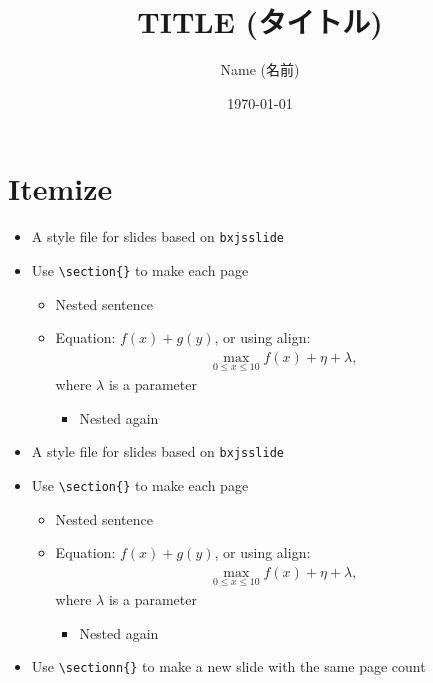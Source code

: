 \documentclass[xelatex,ja=standard,jafont=hiragino-pron,fleqn,no-math,25pt,paper={190.5truemm}{254truemm},english]{bxjsslidemd}
\title{TITLE (タイトル)}
\author{Name (名前)}
\date{\today}
\begin{document}
\maketitle

\section{Itemize}
\begin{itemize}
 \item A style file for slides based on \texttt{bxjsslide}
 \item Use \verb|\section{}| to make each page
       \begin{itemize}
	\item Nested sentence
	\item Equation: $f(x) + g(y)$, or using align:
	      \begin{align*}
	       \max_{0 \le x \le 10} f(x) + \eta + \lambda,
	      \end{align*}
	      where $\lambda$ is a parameter
	      \begin{itemize}
	       \item Nested again
	      \end{itemize}
       \end{itemize}
 \end{itemize}

\begin{itemize}
 \item A style file for slides based on \texttt{bxjsslide}
 \item Use \verb|\section{}| to make each page
       \begin{itemize}
	\item Nested sentence
	\item Equation: $f(x) + g(y)$, or using align:
	      \begin{align*}
	       \max_{0 \le x \le 10} f(x) + \eta + \lambda,
	      \end{align*}
	      where $\lambda$ is a parameter
	      \begin{itemize}
	       \item Nested again
	      \end{itemize}
       \end{itemize}
 \item Use \verb|\sectionn{}| to make a new slide with the same page count
\end{itemize}
\end{document}
